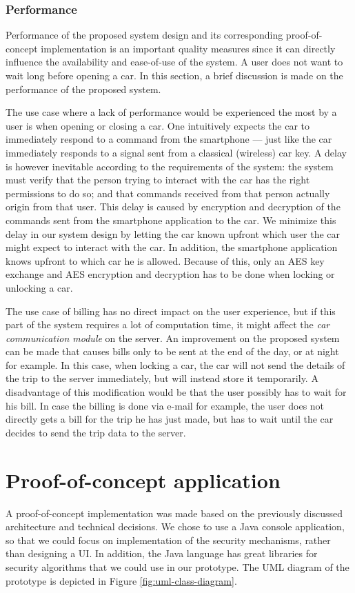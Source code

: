 \documentclass[12pt,a4paper, oneside]{article}
\begin{document}
\subsubsection{Performance}
Performance of the proposed system design and its corresponding proof-of-concept implementation is an important quality measures since it can directly influence the availability and ease-of-use of the system. A user does not want to wait long before opening a car. In this section, a brief discussion is made on the performance of the proposed system.\par
The use case where a lack of performance would be experienced the most by a user is when opening or closing a car. One intuitively expects the car to immediately respond to a command from the smartphone --- just like the car immediately responds to a signal sent from a classical (wireless) car key. A delay is however inevitable according to the requirements of the system: the system must verify that the person trying to interact with the car has the right permissions to do so; and that commands received from that person actually origin from that user. This delay is caused by encryption and decryption of the commands sent from the smartphone application to the car. We minimize this delay in our system design by letting the car known upfront which user the car might expect to interact with the car. In addition, the smartphone application knows upfront to which car he is allowed. Because of this, only an AES key exchange and AES encryption and decryption has to be done when locking or unlocking a car.\par
The use case of billing has no direct impact on the user experience, but if this part of the system requires a lot of computation time, it might affect the \textit{car communication module} on the server. An improvement on the proposed system can be made that causes bills only to be sent at the end of the day, or at night for example. In this case, when locking a car, the car will not send the details of the trip to the server immediately, but will instead store it temporarily. A disadvantage of this modification would be that the user possibly has to wait for his bill. In case the billing is done via e-mail for example, the user does not directly gets a bill for the trip he has just made, but has to wait until the car decides to send the trip data to the server.

\section{Proof-of-concept application}
A proof-of-concept implementation was made based on the previously discussed architecture and technical decisions. We chose to use a Java console application, so that we could focus on implementation of the security mechanisms, rather than designing a UI. In addition, the Java language has great libraries for security algorithms that we could use in our prototype. The UML diagram of the prototype is depicted in Figure \ref{fig:uml-class-diagram}.\par
\end{document}
